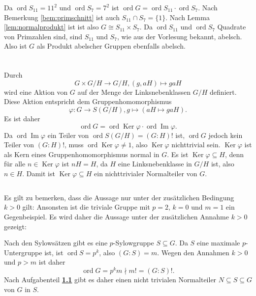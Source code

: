 \documentclass[a4paper,10pt]{article}
\theoremstyle{definition}
\newcommand{\ord}{\operatorname{ord}}
\newcommand{\Img}{\operatorname{Im}}
\newcommand{\Ker}{\operatorname{Ker}}
\begin{document}
Da $\ord S_{11} = 11^2$ und $\ord S_7 = 7^2$ ist $\ord G = \ord S_{11} \cdot \ord S_7$. Nach Bemerkung \ref{bem:primschnitt} ist auch $S_{11} \cap S_7 = \{1\}$. Nach Lemma \ref{lem:normalprodukt} ist ist also $G \cong S_{11} \times S_7$. Da $\ord S_{11}$ und $\ord S_7$ Quadrate von Primzahlen sind, sind $S_{11}$ und $S_7$, wie aus der Vorlesung bekannt, abelsch. Also ist $G$ als Produkt abelscher Gruppen ebenfalls abelsch.





\section{}


\subsection{}\label{ssec:fak}
Durch
\[
 G \times G/H \rightarrow G/H, (g,aH) \mapsto gaH
\]
wird eine Aktion von $G$ auf der Menge der Linksnebenklassen $G/H$ definiert. Diese Aktion entspricht dem Gruppenhomomorphismus
\[
 \varphi : G \rightarrow S(G/H), g \mapsto (aH \mapsto gaH).
\]
Es ist daher
\[
 \ord G
 = \ord \Ker \varphi \cdot \ord \Img \varphi.
\]
Da $\ord \Img \varphi$ ein Teiler von $\ord S(G/H) = (G:H)!$ ist, $\ord G$ jedoch kein Teiler von $(G : H)!$, muss $\ord \Ker \varphi \neq 1$, also $\Ker \varphi$ nichttrivial sein. $\Ker \varphi$ ist als Kern eines Gruppenhomomorphismus normal in $G$. Es ist $\Ker \varphi \subseteq H$, denn für alle $n \in \Ker \varphi$ ist $nH = H$, da $H$ eine Linksnebenklasse in $G/H$ ist, also $n \in H$. Damit ist $\Ker \varphi \subseteq H$ ein nichttrivialer Normalteiler von $G$.


\subsection{}
Es gilt zu bemerken, dass die Aussage nur unter der zusätzlichen Bedingung $k > 0$ gilt: Ansonsten ist die triviale Gruppe mit $p=2$, $k=0$ und $m=1$ ein Gegenbeispiel. Es wird daher die Aussage unter der zusätzlichen Annahme $k > 0$ gezeigt:

Nach den Sylowsätzen gibt es eine $p$-Sylowgruppe $S \subseteq G$. Da $S$ eine maximale $p$-Untergruppe ist, ist $\ord S = p^k$, also $(G : S) = m$. Wegen den Annahmen $k > 0$ und $p > m$ ist daher
\[
\ord G = p^k m \nmid m! = (G : S)!.
\]
Nach Aufgabenteil \textbf{\ref{ssec:fak}} gibt es daher einen nicht trivialen Normalteiler $N \subseteq S \subseteq G$ von $G$ in $S$.
\end{document}
